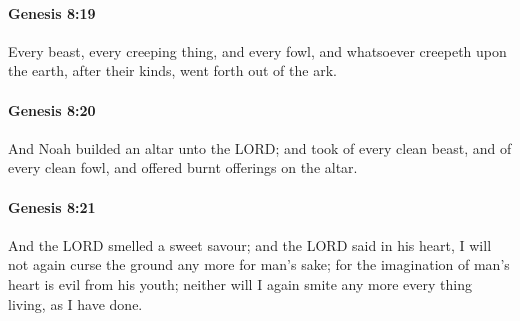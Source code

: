 		\paragraph{Genesis 8:19} %
			\label{GENESIS-8-19}

			Every beast, every creeping thing, and every fowl, and whatsoever creepeth upon the earth, after their kinds, went forth out of the ark.


		\paragraph{Genesis 8:20} %
			\label{GENESIS-8-20}

			And Noah builded an altar unto the LORD; and took of every clean beast, and of every clean fowl, and offered burnt offerings on the altar.


		\paragraph{Genesis 8:21} %
			\label{GENESIS-8-21}

			And the LORD smelled a sweet savour; and the LORD said in his heart, I will not again curse the ground any more for man's sake; for the imagination of man's heart is evil from his youth; neither will I again smite any more every thing living, as I have done.


